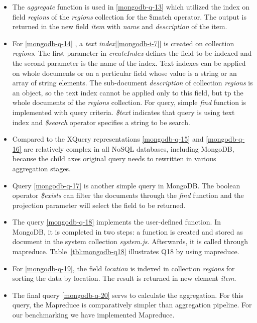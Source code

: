 \begin{itemize}

\item The \textit{aggregate} function is used in \ref{mongodb-q-13} which utilized the index on field \textit{regions} of the \textit{regions} collection for the \$match operator. The output is returned in the new field \textit{item} with \textit{name} and \textit{description} of the item.

\item For \ref{mongodb-q-14} , a \textit{text index}[\ref{mongodb-i-7}] is created on collection \textit{regions}. The first parameter in \textit{createIndex} defines the field to be indexed and the second parameter is the name of the index. Text indexes can be applied on whole documents or on a perticular field whose value is a string or an array of string elements. The sub-document \textit{description} of collection \textit{regions} is an object, so the text index cannot be applied only to this field, but tp the whole documents of the \textit{regions} collection.  For query, simple \textit{find} function is implemented with query criteria. \textit{\$text} indicates that query is using text index and \textit{\$search} operator specifies a string to be search. 

\item Compared to the XQuery representations \ref{mongodb-q-15} and \ref{mongodb-q-16} are relatively complex in all NoSQL databases, including MongoDB, because the child axes original query needs to rewritten in various aggregation stages.
\item Query \ref{mongodb-q-17} is another simple query in MongoDB. The boolean operator \textit{\$exists} can filter the documents through the \textit{find} function and the projection parameter will select the field to be returned. 

\item The query \ref{mongodb-q-18} implements the user-defined function. In MongoDB, it is completed in two steps: a function is created and stored as document in the system collection \textit{system.js}. Afterwards, it is called through mapreduce. Table~\ref{tbl:mongodb-q18} illustrates Q18 by using mapreduce.
\item For \ref{mongodb-q-19}, the field  \textit{location} is indexed in collection \textit{regions} for sorting the data by location. The result is returned in new element \textit{item}.
\item
The final query \ref{mongodb-q-20} servs to calculate the aggregation. For this query, the Mapreduce is comparatively simpler than aggregation pipeline. For our benchmarking we have implemented Mapreduce. 
\end{itemize}
